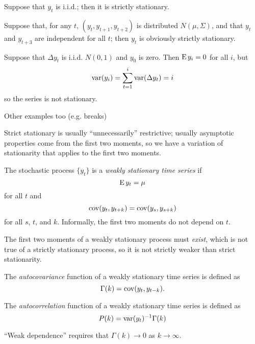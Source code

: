 \begin{ex}
  Suppose that $y_t$ is i.i.d.; then it is strictly stationary.
\end{ex}

\begin{ex}
  Suppose that, for any $t$, $(y_t, y_{t+1}, y_{t+2})$ is distributed
  $N(\mu,\Sigma)$, and that $y_t$ and $y_{t+3}$ are independent for
  all $t$; then $y_t$ is obviously strictly stationary.
\end{ex}

\begin{ex}
  Suppose that $\Delta y_t$ is i.i.d. $N(0,1)$ and $y_0$ is zero. Then
  $\operatorname{E} y_i = 0$ for all $i$, but
  \begin{equation*}
    \operatorname{var}(y_i) = \sum_{t=1}^i \operatorname{var}(\Delta y_t) = i
  \end{equation*}
  so the series is not stationary.
\end{ex}

Other examples too (e.g. breaks)

Strict stationary is usually ``unnecessarily'' restrictive; usually
asymptotic properties come from the first two moments, so we have a
variation of stationarity that applies to the first two moments.

\begin{defn}
  The stochastic process $\{y_t\}$ is a \emph{weakly stationary time
    series} if
  \begin{equation*}
    \operatorname{E} y_t = \mu
  \end{equation*}
  for all $t$ and
  \begin{equation*}
    \operatorname{cov}(y_t, y_{t+k}) = \operatorname{cov}(y_s, y_{s+k})
  \end{equation*}
  for all $s$, $t$, and $k$.
  Informally, the first two moments do not depend on $t$.
\end{defn}

The first two moments of a weakly stationary process must
\emph{exist}, which is not true of a strictly stationary process, so
it is not strictly weaker than strict stationarity.

\begin{defn}
  The \emph{autocovariance} function of a weakly stationary time
  series is defined as
  \begin{equation*}
    \Gamma(k) = \operatorname{cov}(y_t, y_{t-k}).
  \end{equation*}

  The \emph{autocorrelation} function of a weakly stationary time
  series is defined as
  \begin{equation*}
    P(k) = \operatorname{var}(y_t)^{-1} \Gamma(k)
  \end{equation*}
\end{defn}
``Weak dependence'' requires that $\Gamma(k) \to 0$ as $k \to \infty$.

